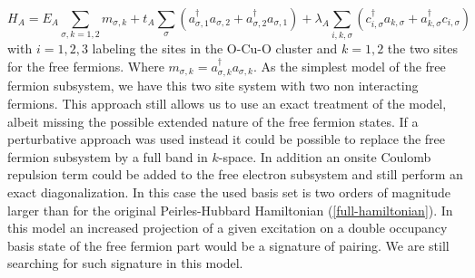 \begin{equation}
\label{eq:multicomponent}
H_A = 
E_A \sum_{\sigma, k=1,2} m_{\sigma, k} + 
t_A \sum_{\sigma} (a_{\sigma, 1}^\dagger a_{\sigma, 2} + a_{\sigma,2}^\dagger a_{\sigma, 1}) + 
\lambda_A \sum_{i,k,\sigma} \left( c_{i,\sigma}^\dagger a_{k,\sigma} + a_{k,\sigma}^\dagger c_{i,\sigma} \right) \end{equation}
%
with $i=1,2,3$ labeling the sites in the O-Cu-O cluster and $k=1,2$ the two sites for the free fermions. Where $m_{\sigma, k} = a_{\sigma, k}^\dagger a_{\sigma, k}$.
As the simplest model of the free fermion subsystem, we have this two site system with two non interacting fermions. This approach still allows us to use an exact treatment of the model, albeit missing the possible extended nature of the free fermion states. If a perturbative approach was used instead it could be possible to replace the free fermion subsystem by a full band in $k$-space. In addition an onsite Coulomb repulsion term could be added to the free electron subsystem and still perform an exact diagonalization.  In this case the used basis set is two orders of magnitude larger than for the original Peirles-Hubbard Hamiltonian (\ref{full-hamiltonian}). In this model an increased projection of a given excitation on a double occupancy basis state of the free fermion part  would be a signature of pairing. We are still searching for such signature in this model.

